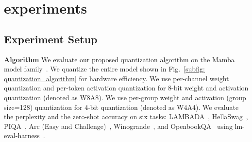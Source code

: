 \section{experiments}
\label{sec:experiments}

\subsection{Experiment Setup}
\label{subsec:Evaluation Setup}


\textbf{Algorithm}
We evaluate our proposed quantization algorithm
on the Mamba model family~\cite{dao2024transformers}.
We quantize the entire model shown in Fig.~\ref{subfig: quantization_algorithm}
for hardware efficiency.
We use per-channel weight quantization 
and per-token activation quantization for 8-bit weight and activation quantization (denoted as W8A8).
We use per-group weight and activation (group size=128) quantization for 4-bit quantization (denoted as W4A4).
We evaluate the perplexity
and the zero-shot accuracy on six tasks:
LAMBADA~\cite{radford2019language}, 
HellaSwag~\cite{zellers2019hellaswag},
PIQA~\cite{bisk2020piqa},
Arc (Easy and Challenge)~\cite{clark2018think},
Winogrande~\cite{sakaguchi2021winogrande},
and OpenbookQA~\cite{mihaylov2018can}
using lm-eval-harness~\cite{eval-harness}.

